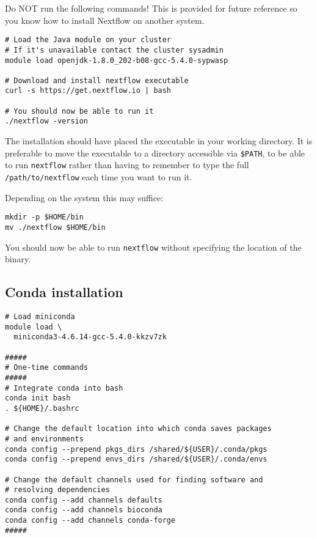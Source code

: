 \begin{warning}

Do NOT run the following commands! 
This is provided for future reference so you know how to install Nextflow on another system. 

\begin{lstlisting}
# Load the Java module on your cluster
# If it's unavailable contact the cluster sysadmin
module load openjdk-1.8.0_202-b08-gcc-5.4.0-sypwasp 

# Download and install nextflow executable
curl -s https://get.nextflow.io | bash

# You should now be able to run it
./nextflow -version
\end{lstlisting}

The installation should have placed the executable in your working directory.
It is preferable to move the executable to a directory accessible via \texttt{\$PATH}, 
to be able to run \texttt{nextflow} rather than having to remember 
to type the full \texttt{/path/to/nextflow} each time you want to run it.

Depending on the system this may suffice:

\begin{lstlisting}
mkdir -p $HOME/bin
mv ./nextflow $HOME/bin
\end{lstlisting}

You should now be able to run \texttt{nextflow} without specifying the location of the binary.

\end{warning}


\subsection{Conda installation}

\begin{steps}
\begin{lstlisting}
# Load miniconda
module load \
  miniconda3-4.6.14-gcc-5.4.0-kkzv7zk

#####
# One-time commands
#####
# Integrate conda into bash
conda init bash
. ${HOME}/.bashrc

# Change the default location into which conda saves packages
# and environments
conda config --prepend pkgs_dirs /shared/${USER}/.conda/pkgs
conda config --prepend envs_dirs /shared/${USER}/.conda/envs

# Change the default channels used for finding software and
# resolving dependencies
conda config --add channels defaults
conda config --add channels bioconda
conda config --add channels conda-forge
#####
\end{lstlisting}
\end{steps}

